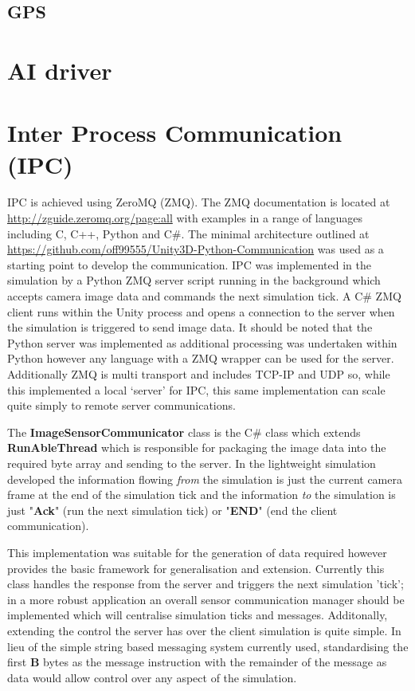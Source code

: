 \documentclass{article}
\begin{document}
\subsection{GPS}

\section{AI driver}


\section{Inter Process Communication (IPC)}

IPC is achieved using ZeroMQ (ZMQ). The ZMQ documentation is located at \url{http://zguide.zeromq.org/page:all} with examples in a range of languages including C, C++, Python and C\#. The minimal architecture outlined at \url{https://github.com/off99555/Unity3D-Python-Communication} was used as a starting point to develop the communication. IPC was implemented in the simulation by a Python ZMQ server script running in the background which accepts camera image data and commands the next simulation tick. A C\# ZMQ client runs within the Unity process and opens a connection to the server when the simulation is triggered to send image data. It should be noted that the Python server was implemented as additional processing was undertaken within Python however any language with a ZMQ wrapper can be used for the server. Additionally ZMQ is multi transport and includes TCP-IP and UDP so, while this implemented a local `server' for IPC, this same implementation can scale quite simply to remote server communications. 

The \textbf{ImageSensorCommunicator} class is the C\# class which extends \textbf{RunAbleThread} which is responsible for packaging the image data into the required byte array and sending to the server. In the lightweight simulation developed the information flowing \textit{from} the simulation is just the current camera frame at the end of the simulation tick and the information \textit{to} the simulation is just "\textbf{Ack}" (run the next simulation tick) or "\textbf{END}" (end the client communication).

This implementation was suitable for the generation of data required however provides the basic framework for generalisation and extension. Currently this class handles the response from the server and triggers the next simulation 'tick'; in a more robust application an overall sensor communication manager should be implemented which will centralise simulation ticks and messages. Additonally, extending the control the server has over the client simulation is quite simple. In lieu of the simple string based messaging system currently used, standardising the first \textbf{B} bytes as the message instruction with the remainder of the message as data would allow control over any aspect of the simulation. 
\end{document}
